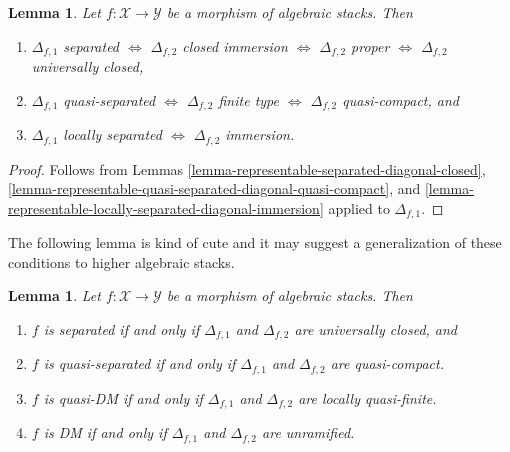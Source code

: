 \documentclass{stacks-project}
\theoremstyle{plain}
\newtheorem{lemma}[subsection]{Lemma}
\theoremstyle{definition}
\theoremstyle{remark}
\numberwithin{equation}{subsection}
\begin{document}
\begin{lemma}
\label{lemma-first-diagonal-separated-second-diagonal-closed}
Let $f : \mathcal{X} \to \mathcal{Y}$ be a morphism of algebraic stacks.
Then
\begin{enumerate}
\item $\Delta_{f, 1}$ separated $\Leftrightarrow$
$\Delta_{f, 2}$ closed immersion $\Leftrightarrow$
$\Delta_{f, 2}$ proper $\Leftrightarrow$
$\Delta_{f, 2}$ universally closed,
\item $\Delta_{f, 1}$ quasi-separated $\Leftrightarrow$
$\Delta_{f, 2}$ finite type $\Leftrightarrow$ $\Delta_{f, 2}$ quasi-compact,
and
\item $\Delta_{f, 1}$ locally separated $\Leftrightarrow$
$\Delta_{f, 2}$ immersion.
\end{enumerate}
\end{lemma}

\begin{proof}
Follows from
Lemmas \ref{lemma-representable-separated-diagonal-closed},
\ref{lemma-representable-quasi-separated-diagonal-quasi-compact}, and
\ref{lemma-representable-locally-separated-diagonal-immersion}
applied to $\Delta_{f, 1}$.
\end{proof}

\noindent
The following lemma is kind of cute and it may suggest a generalization
of these conditions to higher algebraic stacks.

\begin{lemma}
\label{lemma-definition-separated}
Let $f : \mathcal{X} \to \mathcal{Y}$ be a morphism of algebraic stacks.
Then
\begin{enumerate}
\item $f$ is separated if and only if $\Delta_{f, 1}$ and $\Delta_{f, 2}$
are universally closed, and
\item $f$ is quasi-separated if and only if $\Delta_{f, 1}$ and $\Delta_{f, 2}$
are quasi-compact.
\item $f$ is quasi-DM if and only if $\Delta_{f, 1}$ and $\Delta_{f, 2}$
are locally quasi-finite.
\item $f$ is DM if and only if $\Delta_{f, 1}$ and $\Delta_{f, 2}$
are unramified.
\end{enumerate}
\end{lemma}
\end{document}
